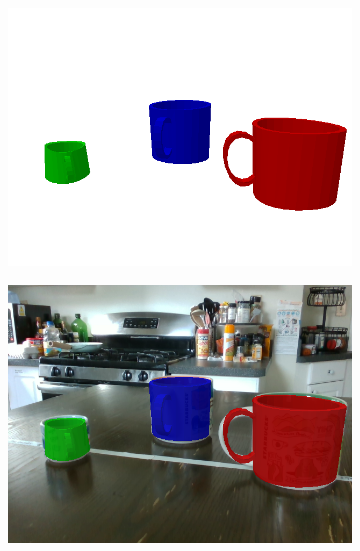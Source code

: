 \documentclass{article}
\begin{document}
\begin{figure}[]
\begin{subfigure}{(\linewidth - 0.05\linewidth)/5}
        \includegraphics[width=\linewidth]{figures/real2sim2real/2/3_sim.png}
    \end{subfigure}
    \begin{subfigure}{(\linewidth - 0.05\linewidth)/5}
        \centering
        \includegraphics[width=\linewidth]{figures/real2sim2real/2/3.png}
    \end{subfigure}
    \begin{subfigure}{(\linewidth - 0.05\linewidth)/5}
        \centering

\end{subfigure}
\end{figure}
\end{document}
